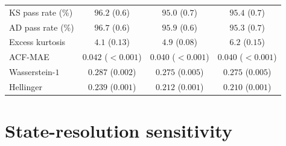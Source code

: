 \begin{table}[H]
\begin{tabular}{@{}lccc@{}}
KS pass rate (\%)   & $\mathbf{96.2}$ ($0.6$) &  $95.0$ ($0.7$)         &  $95.4$ ($0.7$) \\
AD pass rate (\%)   & $\mathbf{96.7}$ ($0.6$) &  $95.9$ ($0.6$)         &  $95.3$ ($0.7$) \\
Excess kurtosis     &   $4.1$ ($0.13$)        &   $4.9$ ($0.08$)        & $\mathbf{6.2}$ ($0.15$) \\
ACF-MAE             & $0.042$ ($<\!0.001$)    & $\mathbf{0.040}$ ($<\!0.001$) & $\mathbf{0.040}$ ($<\!0.001$) \\
Wasserstein-$1$     & $0.287$ ($0.002$)       & $\mathbf{0.275}$ ($0.005$) & $\mathbf{0.275}$ ($0.005$) \\
Hellinger           & $0.239$ ($0.001$)       & $0.212$ ($0.001$)       & $\mathbf{0.210}$ ($0.001$) \\
\bottomrule
\end{tabular}
\end{table}


\section{State-resolution sensitivity}
\label{sec:supp-sensitivity}

